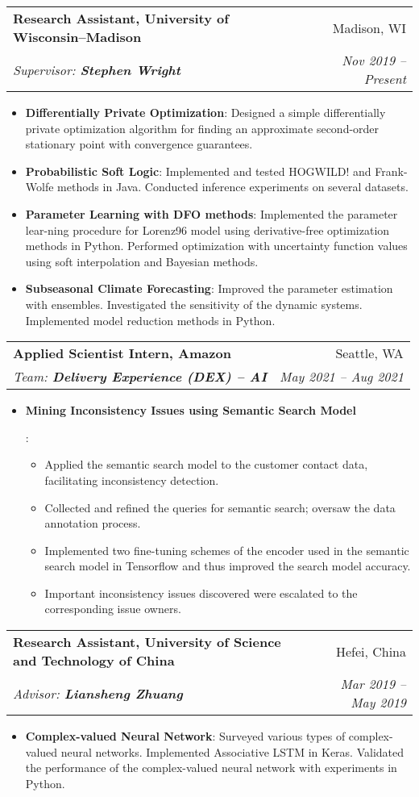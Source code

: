 \documentclass[letterpaper,12pt]{article}
\makeatletter
\newcommand{\resumeItem}[2]{
  \item\small{
    \textbf{#1}{: #2 \vspace{-2pt}}
  }
}
\newcommand{\resumeSubheading}[4]{
  \vspace{-1pt}\item
    \begin{tabular*}{0.97\textwidth}[t]{l@{\extracolsep{\fill}}r}
      \textbf{#1} & #2 \\
      \textit{\small#3} & \textit{\small #4} \\
    \end{tabular*}\vspace{-5pt}
}
\newcommand{\resumeItemListStart}{\begin{itemize}}
\newcommand{\resumeItemListEnd}{\end{itemize}\vspace{-5pt}}
\makeatother
\begin{document}
\resumeSubheading
{Research Assistant, University of Wisconsin--Madison}{Madison, WI}
{Supervisor: \textup{\textbf{Stephen Wright}}}{Nov 2019 -- Present}
\resumeItemListStart
\resumeItem{Differentially Private Optimization}
{Designed a simple differentially private optimization algorithm for finding an approximate second-order stationary point with convergence guarantees.}
\resumeItem{Probabilistic Soft Logic}
{Implemented and tested HOGWILD! and Frank-Wolfe methods in Java. Conducted inference experiments on several datasets.}
\resumeItem{Parameter Learning with DFO methods}
{Implemented the parameter lear-ning procedure for Lorenz96 model using derivative-free optimization methods in Python. Performed optimization with uncertainty function values using soft interpolation and Bayesian methods.}
\resumeItem{Subseasonal Climate Forecasting}
{Improved the parameter estimation with ensembles. Investigated the sensitivity of the dynamic systems. Implemented model reduction methods in Python.}
\resumeItemListEnd


\resumeSubheading {Applied Scientist Intern, Amazon}{Seattle, WA}
{Team: \textup{\textbf{Delivery Experience (DEX) -- AI}}}{May 2021 -- Aug 2021}
\resumeItemListStart
\resumeItem{Mining Inconsistency Issues using Semantic Search Model}{
  \begin{itemize}
    \item
          Applied the semantic search model to the customer contact data, facilitating inconsistency detection.
    \item Collected and refined the queries for semantic search; oversaw the data annotation process.
    \item Implemented two fine-tuning schemes of the encoder used in the semantic search model in Tensorflow and thus improved the search model accuracy.
    \item Important inconsistency issues discovered were escalated to the corresponding issue owners.
  \end{itemize}
}
\resumeItemListEnd

\resumeSubheading
{Research Assistant, University of Science and Technology of China}{Hefei, China}
{Advisor: \textup{\textbf{Liansheng Zhuang}}}{Mar 2019 -- May 2019}
\resumeItemListStart
\resumeItem{Complex-valued Neural Network}
{Surveyed various types of complex-valued neural networks. Implemented Associative LSTM in Keras. Validated the performance of the complex-valued neural network with experiments in Python.}
\resumeItemListEnd
\end{document}

